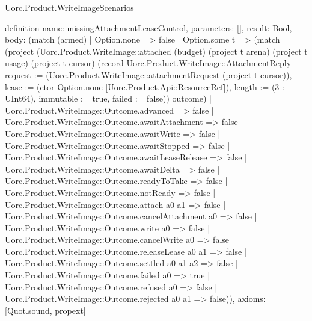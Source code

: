 \begin{lexlean}{Uorc.Product.WriteImageScenarios}
\begin{semanticmodule}
definition{
  name: missingAttachmentLeaseControl,
  parameters: [],
  result: Bool,
  body: (match (armed)
    | Option.none => false
    | Option.some t => (match (project (Uorc.Product.WriteImage::attached (budget) (project t arena) (project t usage) (project t cursor) (record Uorc.Product.WriteImage::AttachmentReply {request := (Uorc.Product.WriteImage::attachmentRequest (project t cursor)), lease := (ctor Option.none [Uorc.Product.Api::ResourceRef]), length := (3 : UInt64), immutable := true, failed := false})) outcome)
      | Uorc.Product.WriteImage::Outcome.advanced => false
      | Uorc.Product.WriteImage::Outcome.awaitAttachment => false
      | Uorc.Product.WriteImage::Outcome.awaitWrite => false
      | Uorc.Product.WriteImage::Outcome.awaitStopped => false
      | Uorc.Product.WriteImage::Outcome.awaitLeaseRelease => false
      | Uorc.Product.WriteImage::Outcome.awaitDelta => false
      | Uorc.Product.WriteImage::Outcome.readyToTake => false
      | Uorc.Product.WriteImage::Outcome.notReady => false
      | Uorc.Product.WriteImage::Outcome.attach a0 a1 => false
      | Uorc.Product.WriteImage::Outcome.cancelAttachment a0 => false
      | Uorc.Product.WriteImage::Outcome.write a0 => false
      | Uorc.Product.WriteImage::Outcome.cancelWrite a0 => false
      | Uorc.Product.WriteImage::Outcome.releaseLease a0 a1 => false
      | Uorc.Product.WriteImage::Outcome.settled a0 a1 a2 => false
      | Uorc.Product.WriteImage::Outcome.failed a0 => true
      | Uorc.Product.WriteImage::Outcome.refused a0 => false
      | Uorc.Product.WriteImage::Outcome.rejected a0 a1 => false)),
  axioms: [Quot.sound, propext]
}


\end{semanticmodule}
\end{lexlean}
